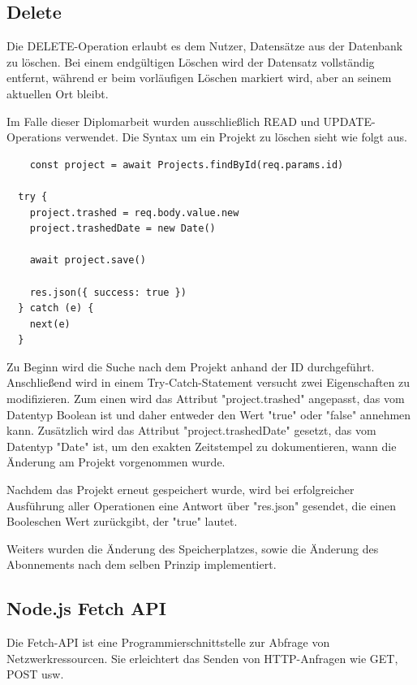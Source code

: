 \subsection{Delete}


Die DELETE-Operation erlaubt es dem Nutzer, Datensätze aus der Datenbank zu löschen. Bei einem endgültigen Löschen wird der Datensatz vollständig entfernt, während er beim vorläufigen Löschen markiert wird, aber an seinem aktuellen Ort bleibt.



Im Falle dieser Diplomarbeit wurden ausschließlich READ und UPDATE-Operations verwendet. Die Syntax um ein Projekt zu löschen sieht wie folgt aus.

\begin{lstlisting}
    const project = await Projects.findById(req.params.id)

  try {
    project.trashed = req.body.value.new
    project.trashedDate = new Date()

    await project.save()

    res.json({ success: true })
  } catch (e) {
    next(e)
  }
\end{lstlisting}

Zu Beginn wird die Suche nach dem Projekt anhand der ID durchgeführt. Anschließend wird in einem Try-Catch-Statement versucht zwei Eigenschaften zu modifizieren. Zum einen wird das Attribut "project.trashed" angepasst, das vom Datentyp Boolean ist und daher entweder den Wert "true" oder "false" annehmen kann. Zusätzlich wird das Attribut "project.trashedDate" gesetzt, das vom Datentyp "Date" ist, um den exakten Zeitstempel zu dokumentieren, wann die Änderung am Projekt vorgenommen wurde.

Nachdem das Projekt erneut gespeichert wurde, wird bei erfolgreicher Ausführung aller Operationen eine Antwort über "res.json" gesendet, die einen Booleschen Wert zurückgibt, der "true" lautet.


Weiters wurden die Änderung des Speicherplatzes, sowie die Änderung des Abonnements nach dem selben Prinzip implementiert.

\cite{CRUD_Operations}

\subsection{Node.js Fetch API}
Die Fetch-API ist eine Programmierschnittstelle zur Abfrage von Netzwerkressourcen. Sie erleichtert das Senden von HTTP-Anfragen wie GET, POST usw.

